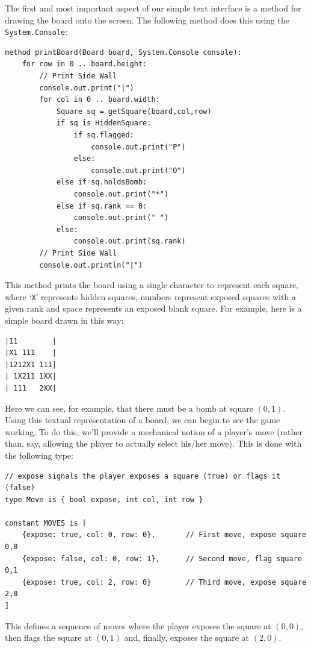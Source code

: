 The first and most important aspect of our simple text interface is a method for drawing the board onto the screen.  The following method does this using the \lstinline{System.Console}:
\begin{lstlisting}
method printBoard(Board board, System.Console console):
    for row in 0 .. board.height:
        // Print Side Wall
        console.out.print("|")
        for col in 0 .. board.width:
            Square sq = getSquare(board,col,row)
            if sq is HiddenSquare:
                if sq.flagged:
                    console.out.print("P")
                else:
                    console.out.print("O")
            else if sq.holdsBomb:
                console.out.print("*")
            else if sq.rank == 0:
                console.out.print(" ")
            else:
                console.out.print(sq.rank)
        // Print Side Wall
        console.out.println("|")
\end{lstlisting} 

This method prints the board using a single character to represent each square, where `\verb+X+' represents hidden squares, numbers represent exposed squares with a given rank and space represents an exposed blank square.  For example, here is a simple board drawn in this way:
\begin{lstlisting}
|11        |
|X1 111    |
|1212X1 111|
| 1X211 1XX|
| 111   2XX|
\end{lstlisting}
Here we can see, for example, that there must be a bomb at square $(0,1)$.  Using this textual representation of a board, we can begin to see the game working.  To do this, we'll provide a mechanical notion of a player's move (rather than, say, allowing the player to actually select his/her move).  This is done with the following type:
\begin{lstlisting}
// expose signals the player exposes a square (true) or flags it (false)
type Move is { bool expose, int col, int row }
        
constant MOVES is [
    {expose: true, col: 0, row: 0},       // First move, expose square 0,0
    {expose: false, col: 0, row: 1},      // Second move, flag square 0,1
    {expose: true, col: 2, row: 0}        // Third move, expose square 2,0
]
\end{lstlisting}

This defines a sequence of moves where the player exposes the square at $(0,0)$, then flags the square at $(0,1)$ and, finally, exposes the square at $(2,0)$.

